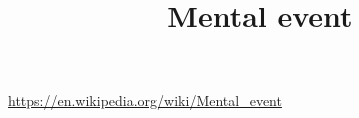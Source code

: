 \documentclass[a4paper]{article}
\title{Mental event}
\date{}
\begin{document}
    \maketitle
    \url{https://en.wikipedia.org/wiki/Mental_event}
\end{document}
